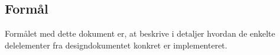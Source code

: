 \subsection{Formål}
Formålet med dette dokument er, at beskrive i detaljer hvordan de enkelte delelementer fra designdokumentet konkret er implementeret. 